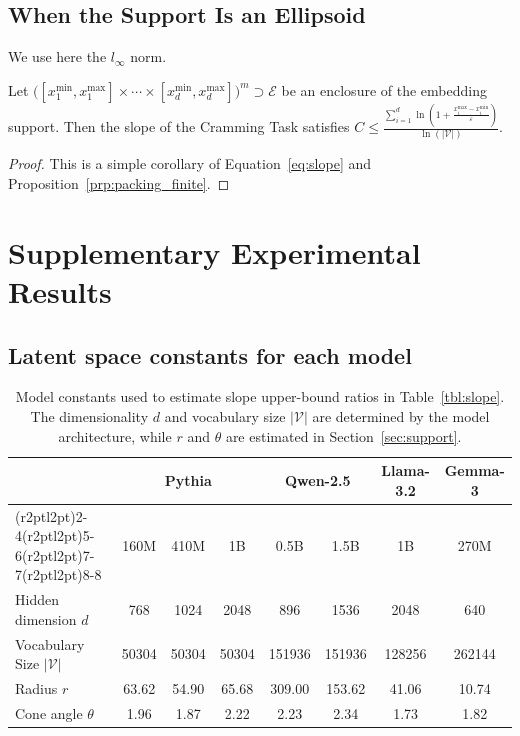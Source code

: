 \subsection{When the Support Is an Ellipsoid}

We use here the $l_\infty$ norm.

\begin{proposition}
    Let $\Big([x^{\mathrm{min}}_1,x^{\mathrm{max}}_1]\times\cdots\times [x^{\mathrm{min}}_d,x^{\mathrm{max}}_d]\Big)^m\supset\mathcal E$ be an enclosure of the embedding support. Then the slope of the Cramming Task satisfies $C\leq \frac{\sum_{i=1}^d\operatorname{ln}(1+\frac {x^{\mathrm{max}}_i-x^{\mathrm{min}}_i}{\varepsilon})}{\operatorname{ln}(|\mathcal V|)}$.
\end{proposition}

\begin{proof}
    This is a simple corollary of Equation~\ref{eq:slope} and Proposition~\ref{prp:packing_finite}.
\end{proof}

\section{Supplementary Experimental Results}

\subsection{Latent space constants for each model}


\begin{table}[ht]
\centering
\begin{tabular}{lccccccc}
\toprule
 & \multicolumn{3}{c}{Pythia} & \multicolumn{2}{c}{Qwen-2.5} & Llama-3.2 & Gemma-3 \\[-0.5ex]
\cmidrule(r{2pt}l{2pt}){2-4}\cmidrule(r{2pt}l{2pt}){5-6}\cmidrule(r{2pt}l{2pt}){7-7}\cmidrule(r{2pt}l{2pt}){8-8}
 & 160M & 410M & 1B & 0.5B & 1.5B & 1B & 270M \\[-0.5ex]
\midrule
Hidden dimension $d$ & 768 & 1024 & 2048 & 896 & 1536 & 2048 & 640   \\
Vocabulary Size $|\mathcal{V}|$& 50304 & 50304 & 50304 & 151936 & 151936 & 128256 & 262144 \\
Radius $r$ &  63.62 &  54.90 &  65.68 &  309.00 & 153.62 & 41.06 &  10.74   \\
Cone angle $\theta$ & 1.96 & 1.87 & 2.22 & 2.23 & 2.34 & 1.73 & 1.82  \\
\bottomrule
\end{tabular}
\vspace{1.0em}
\caption{Model constants used to estimate slope upper-bound ratios in Table~\ref{tbl:slope}. The dimensionality $d$ and vocabulary size $|\mathcal{V}|$ are determined by the model architecture, while $r$ and $\theta$ are estimated in Section~\ref{sec:support}. }
\label{tbl:constants}
\vspace{-1.5em}
\end{table}

